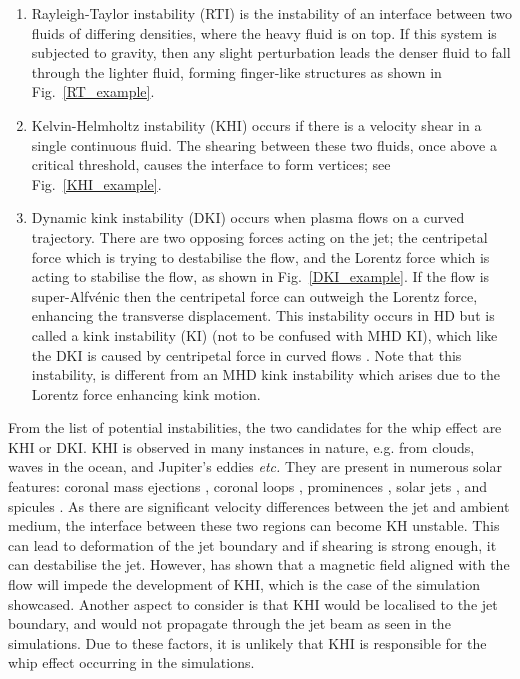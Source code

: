 \documentclass[12pt]{ociamthesis}
\newcommand{\Alfvenic}{Alfv\'{e}nic }
\newcommand{\np}{\\ \\}
\begin{document}
\begin{enumerate}
    \item Rayleigh-Taylor instability (RTI) is the instability of an interface between two fluids of differing densities, where the heavy fluid is on top. If this system is subjected to gravity, then any slight perturbation leads the denser fluid to fall through the lighter fluid, forming finger-like structures as shown in Fig.~\ref{RT_example}.
    \item Kelvin-Helmholtz instability (KHI) occurs if there is a velocity shear in a single continuous fluid. The shearing between these two fluids, once above a critical threshold, causes the interface to form vertices; see Fig.~\ref{KHI_example}.    
    \item Dynamic kink instability (DKI) occurs when plasma flows on a curved trajectory. There are two opposing forces acting on the jet; the centripetal force which is trying to destabilise the flow, and the Lorentz force which is acting to stabilise the flow, as shown in Fig.~\ref{DKI_example}. If the flow is super-\Alfvenic then the centripetal force can outweigh the Lorentz force, enhancing the transverse displacement. This instability occurs in HD but is called a kink instability (KI) (not to be confused with MHD KI), which like the DKI is caused by centripetal force in curved flows \citep{Drazin2002ihsbookD}. Note that this instability, is different from an MHD kink instability which arises due to the Lorentz force enhancing kink motion.
\end{enumerate}
From the list of potential instabilities, the two candidates for the whip effect are KHI or DKI. KHI is observed in many instances in nature, e.g. from clouds, waves in the ocean, and Jupiter's eddies \textit{etc.}  They are present in numerous solar features: coronal mass ejections \citep{Foullon2011ApJ729L8F, Foullon2013ApJ767170F}, coronal loops \citep{Barbulescu2019ApJ870108B}, prominences \citep{Berger2010ApJ7161288B, Ryutova2010SoPh26775R}, solar jets \citep{Filippov2015MNRAS4511117F,Li2018NatSR88136L}, and spicules \citep{Kuridze2016ApJ830133K, Antolin2018ApJ85644A}. As there are significant velocity differences between the jet and ambient medium, the interface between these two regions can become KH unstable. This can lead to deformation of the jet boundary and if shearing is strong enough, it can destabilise the jet. However, \cite{Chandrasekhar1961hhsbookC} has shown that a magnetic field aligned with the flow will impede the development of KHI, which is the case of the simulation showcased. Another aspect to consider is that KHI would be localised to the jet boundary, and would not propagate through the jet beam as seen in the simulations. Due to these factors, it is unlikely that KHI is responsible for the whip effect occurring in the simulations. \np 
\end{document}
